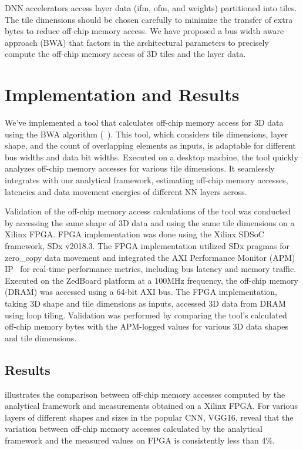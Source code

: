 DNN accelerators access layer data (ifm, ofm, and weights) partitioned into tiles. The tile dimensions should be chosen carefully to minimize the transfer of extra bytes to reduce off-chip memory access. We have proposed a bus width aware approach (BWA) that factors in the architectural parameters to precisely compute the off-chip memory access of 3D tiles and the layer data.

\section{Implementation and Results}
We've implemented a tool that calculates off-chip memory access for 3D data using the BWA algorithm (~). This tool, which considers tile dimensions, layer shape, and the count of overlapping elements as inputs, is adaptable for different bus widths and data bit widths. Executed on a desktop machine, the tool quickly analyzes off-chip memory accesses for various tile dimensions. It seamlessly integrates with our analytical framework, estimating off-chip memory accesses, latencies and data movement energies of different NN layers across.

Validation of the off-chip memory access calculations of the tool was conducted by accessing the same shape of 3D data and using the same tile dimensions on a Xilinx FPGA. FPGA implementation was done using the Xilinx SDSoC framework, SDx v2018.3. The FPGA implementation utilized SDx pragmas for zero\_copy data movement and integrated the AXI Performance Monitor (APM) IP~\cite{APM} for real-time performance metrics, including bus latency and memory traffic. Executed on the ZedBoard platform at a 100MHz frequency, the off-chip memory (DRAM) was accessed using a 64-bit AXI bus. The FPGA implementation, taking 3D shape and tile dimensions as inputs, accessed 3D data from DRAM using loop tiling. Validation was performed by comparing the tool's calculated off-chip memory bytes with the APM-logged values for various 3D data shapes and tile dimensions.
\subsection{Results}
 illustrates the comparison between off-chip memory accesses computed by the analytical framework and measurements obtained on a Xilinx FPGA. For various layers of different shapes and sizes in the popular CNN, VGG16, reveal that the variation between off-chip memory accesses calculated by the analytical framework and the measured values on FPGA is consistently less than 4\%.  

